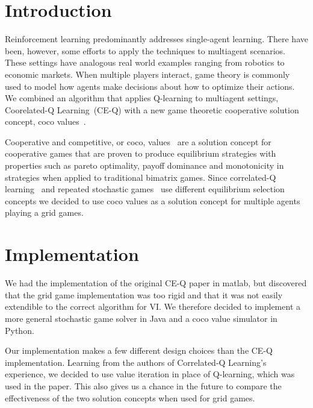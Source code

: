 
\section{Introduction}
\nocite{*}

\hspace{5mm}Reinforcement learning predominantly addresses single-agent learning. There have been, however, some efforts to apply the techniques to multiagent scenarios. These settings have analogous real world examples ranging from robotics to economic markets. When multiple players interact, game theory is commonly used to model how agents make decisions about how to optimize their actions. We combined an algorithm that applies Q-learning to multiagent settings, Coorelated-Q Learning~\cite{Greenwald03correlated-qlearning}(CE-Q) with a new game theoretic cooperative solution concept, coco values~\cite{Kalai_acooperative}.

Cooperative and competitive, or coco, values~\cite{Kalai:2011:CTP:1978721.1978725, Kalai:2010:CCS:1807342.1807397, Kalai_acooperative} are a solution concept for cooperative games that are proven to produce equilibrium strategies with properties such as pareto optimality, payoff dominance and monotonicity in strategies when applied to traditional bimatrix games. Since correlated-Q learning~\cite{Greenwald03correlated-qlearning} and repeated stochastic games~\cite{DBLP:journals/corr/abs-1206-3277} use different equilibrium selection concepts we decided to use coco values as a solution concept for multiple agents playing a grid games. 

\section{Implementation}
\hspace{5mm}We had the implementation of the original CE-Q paper in matlab, but discovered that the grid game implementation was too rigid and that it was not easily extendible to the correct algorithm for VI. We therefore decided to implement a more general stochastic game solver in Java and a coco value simulator in Python. 

\hspace{5mm}Our implementation makes a few different design choices than the CE-Q implementation. Learning from the authors of Correlated-Q Learning's experience, we decided to use value iteration in place of Q-learning, which was used in the paper. This also gives us a chance in the future to compare the effectiveness of the two solution concepts when used for grid games.

